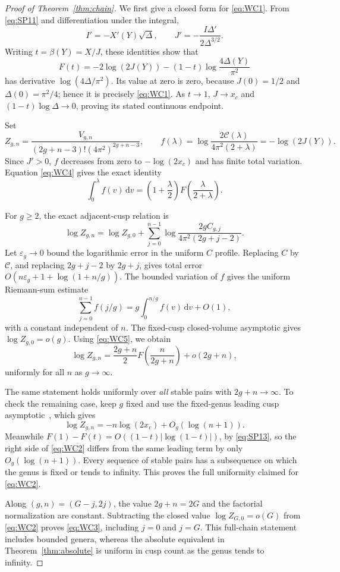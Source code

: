 \begin{proof}[Proof of Theorem~\ref{thm:chain}]
We first give a closed form for \eqref{eq:WC1}. From \eqref{eq:SP11}
and differentiation under the integral, \[
 I'=-X'(Y)\sqrt\Delta,
 \qquad J'=-\frac{I\Delta'}{2\Delta^{3/2}}.
\] Writing \(t=\beta(Y)=X/J\), these identities show that \begin{equation}
F(t)=-2\log(2J(Y))
      -(1-t)\log\frac{4\Delta(Y)}{\pi^2}
 \label{eq:WC4}
\end{equation} has derivative \(\log(4\Delta/\pi^2)\). Its value at zero is zero,
because \(J(0)=1/2\) and \(\Delta(0)=\pi^2/4\); hence it is precisely
\eqref{eq:WC1}. As \(t\to1\), \(J\to x_c\) and \((1-t)\log\Delta\to0\), proving
its stated continuous endpoint.

Set \[
 Z_{g,n}=\frac{V_{g,n}}{(2g+n-3)!(4\pi^2)^{2g+n-3}},\qquad
 f(\lambda)=\log\frac{2\mathcal C(\lambda)}{4\pi^2(2+\lambda)}
            =-\log(2J(Y)).
\] Since \(J'>0\), \(f\) decreases from zero to \(-\log(2x_c)\) and has
finite total variation. Equation \eqref{eq:WC4} gives the exact identity \begin{equation}
\int_0^\lambda f(v)\,\mathrm{d}v
   =\left(1+\frac\lambda2\right)
       F\left(\frac\lambda{2+\lambda}\right).
 \label{eq:WC5}
\end{equation}

For \(g\ge2\), the exact adjacent-cusp relation is \[
 \log Z_{g,n}=\log Z_{g,0}
  +\sum_{j=0}^{n-1}
      \log\frac{2g C_{g,j}}{4\pi^2(2g+j-2)}.
\] Let \(\varepsilon_g\to0\) bound the logarithmic error in the uniform
\(C\) profile. Replacing \(C\) by \(\mathcal C\), and replacing
\(2g+j-2\) by \(2g+j\), gives total error
\(O(n\varepsilon_g+1+\log(1+n/g))\). The bounded variation of \(f\) gives
the uniform Riemann-sum estimate \[
 \sum_{j=0}^{n-1}f(j/g)
       =g\int_0^{n/g}f(v)\,\mathrm{d}v+O(1),
\] with a constant independent of \(n\). The fixed-cusp closed-volume
asymptotic gives \(\log Z_{g,0}=o(g)\). Using \eqref{eq:WC5}, we obtain \begin{equation}
 \log Z_{g,n}
  =\frac{2g+n}{2}F\left(\frac{n}{2g+n}\right)+o(2g+n),
 \label{eq:WC2a}
\end{equation} uniformly for all \(n\) as \(g\to\infty\).

The same statement holds uniformly over \emph{all} stable pairs with
\(2g+n\to\infty\). To check the remaining case, keep \(g\) fixed and use
the fixed-genus leading cusp asymptotic~\cite[Section~6]{ManZ}, which gives \[
 \log Z_{g,n}=-n\log(2x_c)+O_g(\log(n+1)).
\] Meanwhile \(F(1)-F(t)=O((1-t)|\log(1-t)|)\), by \eqref{eq:SP13}, so the right
side of \eqref{eq:WC2} differs from the same leading term by only
\(O_g(\log(n+1))\). Every sequence of stable pairs has a subsequence on
which the genus is fixed or tends to infinity. This proves the full
uniformity claimed for \eqref{eq:WC2}.

Along \((g,n)=(G-j,2j)\), the value \(2g+n=2G\) and the factorial
normalization are constant. Subtracting the closed value
\(\log Z_{G,0}=o(G)\) from \eqref{eq:WC2} proves \eqref{eq:WC3}, including \(j=0\) and
\(j=G\). This full-chain statement includes bounded genera, whereas the
absolute equivalent in Theorem~\ref{thm:absolute} is uniform in cusp count
as the genus tends to infinity.\qedhere
\end{proof}
